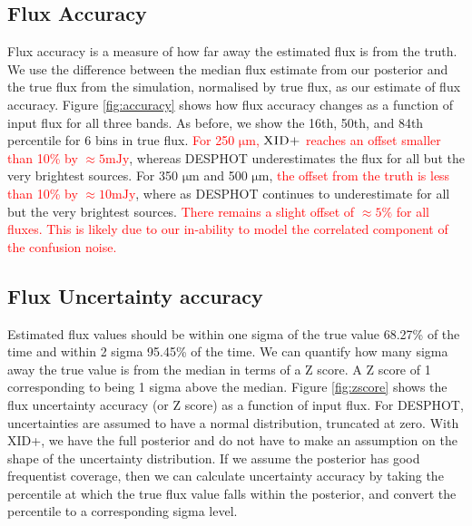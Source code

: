 \documentclass[useAMS,usenatbib]{mnras}
\begin{document}
\subsection{Flux Accuracy}
Flux accuracy is a measure of how far away the estimated flux is from the truth. We use the difference between the median flux estimate from our posterior and the true flux from the simulation, normalised by true flux, as our estimate of flux accuracy. Figure \ref{fig:accuracy} shows how flux accuracy changes as a function of input flux for all three bands. As before, we show the 16th, 50th, and 84th percentile for 6 bins in true flux. \textcolor{red}{For 250 $\mathrm{\mu m}$, $\textsc{XID+}$  reaches an offset smaller than 10\% by $\approx 5 \mathrm{mJy}$}, whereas \textsc{DESPHOT} underestimates the flux for all but the very brightest sources. For 350 $\mathrm{\mu m}$ and 500 $\mathrm{\mu m}$, \textcolor{red}{the offset from the truth is less than 10\% by $\approx10 \mathrm{mJy}$}, where as \textsc{DESPHOT} continues to underestimate for all but the very brightest sources. \textcolor{red}{There remains a slight offset of $\approx5\%$ for all fluxes. This is likely due to our in-ability to model the correlated component of the confusion noise.}

\subsection{Flux Uncertainty accuracy}\label{sec:unc}
Estimated flux values should be within one sigma of the true value 68.27\% of the time and within 2 sigma 95.45\% of the time. We can quantify how many sigma away the true value is from the median in terms of a Z score. A Z score of 1 corresponding to being 1 sigma above the median. Figure \ref{fig:zscore} shows the flux uncertainty accuracy (or Z score) as a function of input flux. For \textsc{DESPHOT}, uncertainties are assumed to have a normal distribution, truncated at zero. With \textsc{XID+}, we have the full posterior and do not have to make an assumption on the shape of the uncertainty distribution. If we assume the posterior has good frequentist coverage, then we can calculate uncertainty accuracy by taking the percentile at which the true flux value falls within the posterior, and convert the percentile to a corresponding sigma level.
\end{document}

